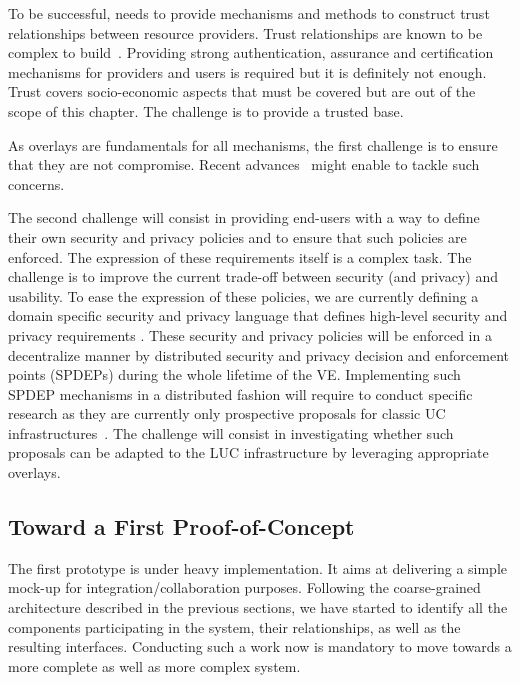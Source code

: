 To be successful, \discovery needs to provide mechanisms and methods to construct trust relationships between resource providers.
Trust relationships are known to be complex to build~\cite{Miller:2010:TWT:1907636.1907726}. Providing strong authentication, assurance and certification mechanisms for 
providers and users is required but it is definitely not enough. Trust covers socio-economic aspects that must be covered but are out of the scope of this chapter.
The challenge is to provide a trusted \discovery base.

As overlays are fundamentals for all \discovery mechanisms, the first challenge is to ensure
that they are not compromise. Recent advances~\cite{Castro:2002:SRS:844128.844156} might enable to tackle such concerns.

The second challenge will consist in providing end-users with a way to define their own security and privacy policies and to ensure that such policies are enforced. 
The expression of these requirements itself is a complex task.
The challenge is to improve the current trade-off between security (and privacy) and usability.
To ease the expression of these policies, we are currently defining a  domain specific security and privacy language
that defines high-level security and privacy requirements \cite{rouzaud_book13b,alefray:hpdc:2013}. 
These security and privacy policies will be enforced in a decentralize manner
by distributed security and privacy decision and enforcement points (SPDEPs) during the whole lifetime of the VE.
Implementing such SPDEP mechanisms in a distributed fashion will require to
conduct specific research as they are currently only prospective proposals for
classic UC infrastructures~\cite{Bacon:2010:EEA:2023718.2023739,sandhu_towards_2010}. 
The challenge will consist in investigating whether such proposals can be adapted to the LUC
infrastructure by leveraging appropriate overlays.


\subsection{Toward a First Proof-of-Concept}

The first prototype is under heavy implementation. It aims at delivering a
simple mock-up for integration/collaboration purposes.  Following the
coarse-grained architecture described in the previous sections, we have
started to identify all the components participating in the system, their
relationships, as well as the resulting interfaces. 
Conducting such a work now is mandatory to move towards a more complete as well
as more complex system. 

